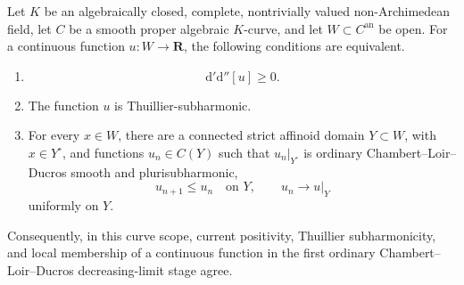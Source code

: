 \begin{theorem}
\label{thm:p063-current-psh-ordinary-regularization}
Let $K$ be an algebraically closed, complete, nontrivially valued
non-Archimedean field, let $C$ be a smooth proper algebraic $K$-curve,
and let $W\subset C^{\mathrm{an}}$ be open.  For a continuous function
$u:W\to\mathbf R$, the following conditions are equivalent.
\begin{enumerate}
\item
\begin{equation}
\label{eq:p063-current-positivity}
                         \mathrm d'\mathrm d''[u]\geq0.
\end{equation}
\item The function $u$ is Thuillier-subharmonic.
\item For every $x\in W$, there are a connected strict affinoid domain
$Y\subset W$, with $x\in Y^\circ$, and functions $u_n\in C(Y)$ such that
$u_n|_{Y^\circ}$ is ordinary Chambert--Loir--Ducros smooth and
plurisubharmonic,
\begin{equation}
\label{eq:p063-monotone-ordinary-approximation}
                         u_{n+1}\leq u_n\quad\text{on }Y,
                         \qquad
                         u_n\longrightarrow u|_Y
\end{equation}
uniformly on $Y$.
\end{enumerate}
Consequently, in this curve scope, current positivity, Thuillier
subharmonicity, and local membership of a continuous function in the first
ordinary Chambert--Loir--Ducros decreasing-limit stage agree.
\end{theorem}
